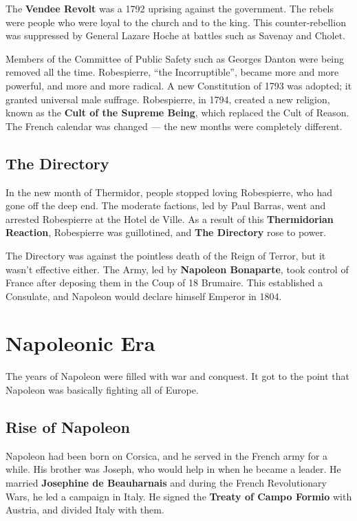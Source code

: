 The \textbf{Vendee Revolt} was a 1792 uprising against the government.
The rebels were people who were loyal to the church and to the king.
This counter-rebellion was suppressed by General Lazare Hoche at battles such as Savenay and Cholet.

Members of the Committee of Public Safety such as Georges Danton were being removed all the time.
Robespierre, ``the Incorruptible'', became more and more powerful, and more and more radical.
A new Constitution of 1793 was adopted; it granted universal male suffrage.
Robespierre, in 1794, created a new religion, known as the \textbf{Cult of the Supreme Being},
which replaced the Cult of Reason.
The French calendar was changed --- the new months were completely different.

\subsection*{The Directory}

In the new month of Thermidor, people stopped loving Robespierre, who had gone off the deep end.
The moderate factions, led by Paul Barras, went and arrested Robespierre at the Hotel de Ville.
As a result of this \textbf{Thermidorian Reaction}, Robespierre was guillotined,
and \textbf{The Directory} rose to power.

The Directory was against the pointless death of the Reign of Terror, but it wasn't effective either.
The Army, led by \textbf{Napoleon Bonaparte},
took control of France after deposing them in the Coup of 18 Brumaire.
This established a Consulate, and Napoleon would declare himself Emperor in 1804.

\section{Napoleonic Era}

The years of Napoleon were filled with war and conquest.
It got to the point that Napoleon was basically fighting all of Europe.

\subsection*{Rise of Napoleon}

Napoleon had been born on Corsica, and he served in the French army for a while.
His brother was Joseph, who would help in when he became a leader.
He married \textbf{Josephine de Beauharnais} and during the French Revolutionary Wars,
he led a campaign in Italy.
He signed the \textbf{Treaty of Campo Formio} with Austria, and divided Italy with them.

